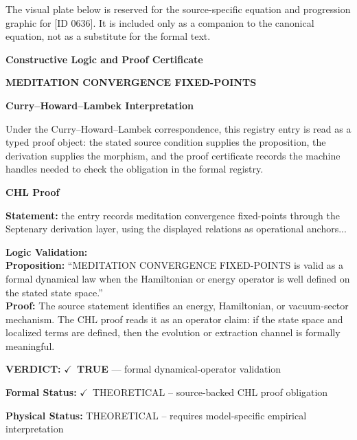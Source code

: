 \begingroup\footnotesize\sloppy
The visual plate below is reserved for the source-specific equation and progression graphic for [ID 0636]. It is included only as a companion to the canonical equation, not as a substitute for the formal text.
\par\endgroup
\ifTZPDarkEdition
{}
\fi

\clearpage
\begingroup\tzpsupportsetup
\noindent\textbf{\fontsize{10.8pt}{12.8pt}\selectfont [ID 0636] Constructive Logic and Proof Certificate}\par
\noindent\textbf{\fontsize{10pt}{12pt}\selectfont MEDITATION CONVERGENCE FIXED-POINTS}\par
\vspace{0.45em}
\begingroup
\footnotesize
\setlength{\parskip}{0.22em}
\setlength{\parindent}{0pt}
\noindent\textbf{Curry--Howard--Lambek Interpretation}\par
Under the Curry--Howard--Lambek correspondence, this registry entry is read as a typed proof
object: the stated source condition supplies the proposition, the derivation supplies the
morphism, and the proof certificate records the machine handles needed to check the obligation
in the formal registry.

\vspace{0.45em}
\noindent\textbf{CHL Proof}\par
\textbf{Statement:} the entry records meditation convergence fixed-points through the Septenary derivation
layer, using the displayed relations as operational anchors...

\textbf{Logic Validation:}\\
\textbf{Proposition:} ``MEDITATION CONVERGENCE FIXED-POINTS is valid as a formal dynamical law when the
Hamiltonian or energy operator is well defined on the stated state space.''\\
\textbf{Proof:} The source statement identifies an energy, Hamiltonian, or vacuum-sector mechanism. The
CHL proof reads it as an operator claim: if the state space and localized terms are
defined, then the evolution or extraction channel is formally meaningful.

\textbf{VERDICT:} \ensuremath{\checkmark}\ \textbf{TRUE} --- formal dynamical-operator validation

\textbf{Formal Status:} \ensuremath{\checkmark}\ THEORETICAL -- source-backed CHL proof obligation

\textbf{Physical Status:} THEORETICAL -- requires model-specific empirical interpretation
\par\vspace{0.45em}
\par
\ifTZPDarkEdition
{}
\fi
\endgroup
\endgroup
